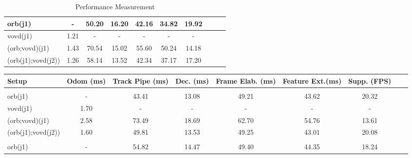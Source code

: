 \begin{table}[ht!]
{\begin{tabular}{|l|c|c|c|c|c|c|c|c|c|}
			\hline
			orb(j1)     					 & -    	 & 50.20 & 16.20 & 42.16 & 34.82 & 19.92  \\ \hline
			vovd(j1)       	 			  & 1.21 & -			& -     	   & -     		 & -     		& -     		\\ \hline
			(orb;vovd)(j1)      	& 1.43 & 70.54 & 15.02  & 55.60 & 50.24 & 14.18  \\ \hline
			(orb(j1);vovd(j2))  & 1.26 & 58.14 & 13.52  & 42.34 & 37.17 & 17.20  \\ \hline
	\end{tabular}}
	\caption{Performance Measurement\label{tab:Performance-Measurement}}
\end{table}





\begin{table}[hbt]
	\begin{tabularx}{\linewidth}{@{}l*{7}{C}c@{}}
		\toprule
		\hline
		Setup              & Odom (ms) & Track Pipe (ms) & Dec. (ms) & Frame Elab. (ms) & Feature Ext.(ms) & Supp. (FPS) \\
		\hline
		                                                                                                                                           \\
		\hline
		orb(j1)            & -             & 43.41          & 13.08             & 49.21                 & 43.62                  & 20.32           \\ \hline
		vovd(j1)           & 1.70          & -              & -                 & -                     & -                      & -               \\ \hline
		(orb;vovd)(j1)     & 2.58          & 73.49          & 18.69             & 62.70                 & 54.76                  & 13.61           \\ \hline
		(orb(j1);vovd(j2)) & 1.60          & 49.81          & 13.53             & 49.25                 & 43.01                  & 20.08           \\ \hline
		                                                                                                                                           \\
		\hline
		orb(j1)            & -             & 54.82          & 14.47             & 49.40                 & 44.35                  & 18.24           \\ \hline

\end{tabularx}
\end{table}
